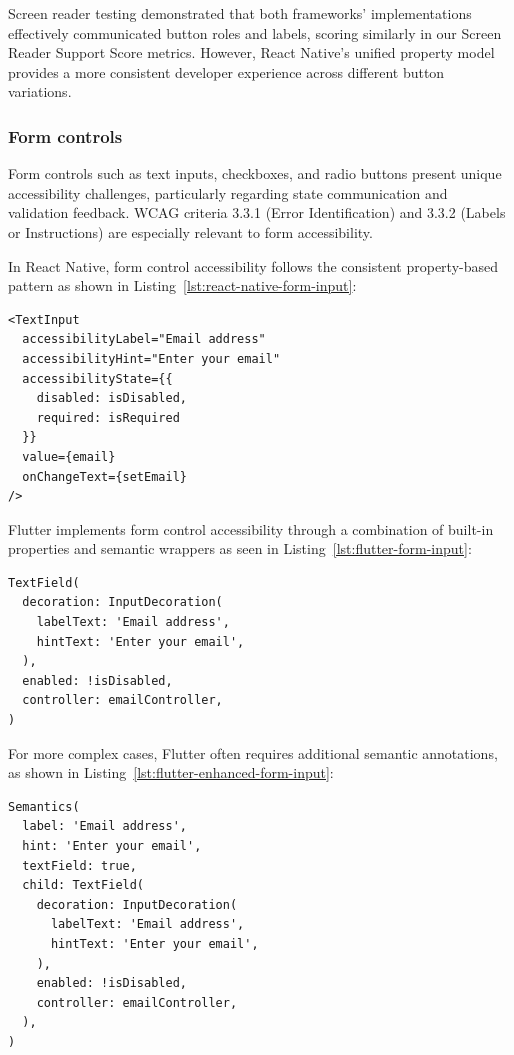 Screen reader testing demonstrated that both frameworks' implementations effectively communicated button roles and labels, scoring similarly in our Screen Reader Support Score metrics. However, React Native's unified property model provides a more consistent developer experience across different button variations.

\subsubsection{Form controls}
\label{subsubsec:form-controls}

Form controls such as text inputs, checkboxes, and radio buttons present unique accessibility challenges, particularly regarding state communication and validation feedback. WCAG criteria 3.3.1 (Error Identification) and 3.3.2 (Labels or Instructions) are especially relevant to form accessibility.

In React Native, form control accessibility follows the consistent property-based pattern as shown in Listing~\ref{lst:react-native-form-input}:

\begin{lstlisting}[style=ReactNativeStyle, caption=Accessible form input in React Native, label=lst:react-native-form-input]
<TextInput
  accessibilityLabel="Email address"
  accessibilityHint="Enter your email"
  accessibilityState={{ 
    disabled: isDisabled,
    required: isRequired 
  }}
  value={email}
  onChangeText={setEmail}
/>
\end{lstlisting}

Flutter implements form control accessibility through a combination of built-in properties and semantic wrappers as seen in Listing~\ref{lst:flutter-form-input}:

\begin{lstlisting}[style=DartStyle, caption=Accessible form input in Flutter, label=lst:flutter-form-input]
TextField(
  decoration: InputDecoration(
    labelText: 'Email address',
    hintText: 'Enter your email',
  ),
  enabled: !isDisabled,
  controller: emailController,
)
\end{lstlisting}

\pagebreak

For more complex cases, Flutter often requires additional semantic annotations, as shown in Listing~\ref{lst:flutter-enhanced-form-input}:

\begin{lstlisting}[style=DartStyle, caption=Enhanced form input accessibility in Flutter, label=lst:flutter-enhanced-form-input]
Semantics(
  label: 'Email address',
  hint: 'Enter your email',
  textField: true,
  child: TextField(
    decoration: InputDecoration(
      labelText: 'Email address',
      hintText: 'Enter your email',
    ),
    enabled: !isDisabled,
    controller: emailController,
  ),
)
\end{lstlisting}

